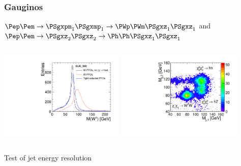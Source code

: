 \documentclass{beamer}
\begin{document}
\begin{frame}
\frametitle{Gauginos}
{\footnotesize $\Pep\Pem \to \PSgxpm_1 \PSgxmp_1\to\PWp\PWm\PSgxz_1\PSgxz_1$ and
$\Pep\Pem \to \PSgxz_2 \PSgxz_2\to \Ph\Ph\PSgxz_1\PSgxz_1$}
\begin{columns}[c]
\column{6cm}
\centering
\includegraphics[width=6cm]{W_reconstruction_mass.pdf}
\column{6cm}
\includegraphics[width=6cm]{../WhizardWorkshop/MassPlot2D}
\end{columns}
\alert{Test of jet energy resolution}
\end{frame}
\end{document}
